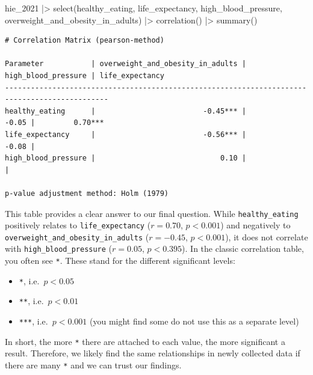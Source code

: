 \documentclass[
  letterpaper,
]{krantz}
\makeatletter
\newenvironment{Shaded}{\begin{snugshade}}{\end{snugshade}}
\newcommand{\FunctionTok}[1]{\textcolor[rgb]{0.28,0.35,0.67}{#1}}
\newcommand{\NormalTok}[1]{\textcolor[rgb]{0.00,0.23,0.31}{#1}}
\newcommand{\SpecialCharTok}[1]{\textcolor[rgb]{0.37,0.37,0.37}{#1}}
\newenvironment{kframe}{%
\medskip{}
\setlength{\fboxsep}{.8em}
 \def\at@end@of@kframe{}%
 \ifinner\ifhmode%
  \def\at@end@of@kframe{\end{minipage}}%
  \begin{minipage}{\columnwidth}%
 \fi\fi%
 \def\FrameCommand##1{\hskip\@totalleftmargin \hskip-\fboxsep
 \colorbox{shadecolor}{##1}\hskip-\fboxsep
     \hskip-\linewidth \hskip-\@totalleftmargin \hskip\columnwidth}%
 \MakeFramed {\advance\hsize-\width
   \@totalleftmargin\z@ \linewidth\hsize
   \@setminipage}}%
 {\par\unskip\endMakeFramed%
 \at@end@of@kframe}
\renewenvironment{Shaded}{\begin{kframe}}{\end{kframe}}
\makeatother
\begin{document}
\begin{Shaded}
\begin{Highlighting}[]
\NormalTok{hie\_2021 }\SpecialCharTok{|\textgreater{}}
  \FunctionTok{select}\NormalTok{(healthy\_eating, life\_expectancy, high\_blood\_pressure, overweight\_and\_obesity\_in\_adults) }\SpecialCharTok{|\textgreater{}}
  \FunctionTok{correlation}\NormalTok{() }\SpecialCharTok{|\textgreater{}}
  \FunctionTok{summary}\NormalTok{()}
\end{Highlighting}
\end{Shaded}

\begin{verbatim}
# Correlation Matrix (pearson-method)

Parameter           | overweight_and_obesity_in_adults | high_blood_pressure | life_expectancy
----------------------------------------------------------------------------------------------
healthy_eating      |                         -0.45*** |               -0.05 |         0.70***
life_expectancy     |                         -0.56*** |               -0.08 |                
high_blood_pressure |                             0.10 |                     |                

p-value adjustment method: Holm (1979)
\end{verbatim}

This table provides a clear answer to our final question. While
\texttt{healthy\_eating} positively relates to \texttt{life\_expectancy}
(\(r = 0.70\), \(p <0.001\)) and negatively to
\texttt{overweight\_and\_obesity\_in\_adults} (\(r = -0.45\),
\(p <0.001\)), it does not correlate with \texttt{high\_blood\_pressure}
(\(r = 0.05\), \(p <0.395\)). In the classic correlation table, you
often see \texttt{*}. These stand for the different significant levels:

\begin{itemize}
\item
  \texttt{*}, i.e.~\(p < 0.05\)
\item
  \texttt{**}, i.e.~\(p < 0.01\)
\item
  \texttt{***}, i.e.~\(p < 0.001\) (you might find some do not use this
  as a separate level)
\end{itemize}

In short, the more \texttt{*} there are attached to each value, the more
significant a result. Therefore, we likely find the same relationships
in newly collected data if there are many \texttt{*} and we can trust
our findings.
\end{document}
